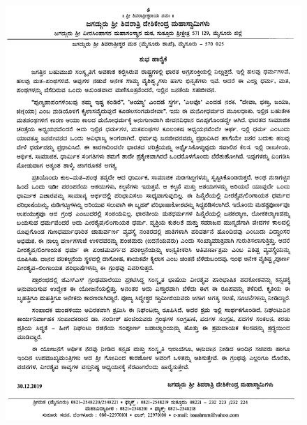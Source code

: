\newpage

\thispagestyle{empty}

\begin{figure}[H]
\centering
\includegraphics[scale=1.15]{images/001.eps}
\end{figure}

\newpage

\thispagestyle{empty}

